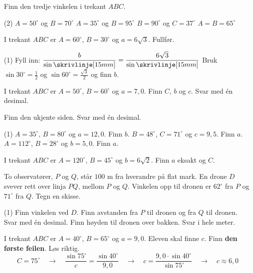 
Finn den tredje vinkelen i trekant $ABC$.
\begin{tasks}(2)
  \task $A = 50^\circ$ og $B = 70^\circ$
  \task $A = 35^\circ$ og $B = 95^\circ$
  \task $B = 90^\circ$ og $C = 37^\circ$
  \task $A = B = 65^\circ$
\end{tasks}

I trekant $ABC$ er $A = 60^\circ$, $B = 30^\circ$ og $a = 6\sqrt3$. Fullfør.
\begin{tasks}(1)
  \task Fyll inn: $\dfrac{b}{\sin \skrivlinje[15mm]} = \dfrac{6\sqrt3}{\sin \skrivlinje[15mm]}$
  \task Bruk $\sin 30^\circ = \frac12$ og $\sin 60^\circ = \frac{\sqrt3}{2}$ og finn $b$.
\end{tasks}

I trekant $ABC$ er $A = 50^\circ$, $B = 60^\circ$ og $a = 7,0$. Finn $C$, $b$ og $c$. Svar med én desimal.


Finn den ukjente siden. Svar med én desimal.
\begin{tasks}(1)
  \task $A = 35^\circ$, $B = 80^\circ$ og $a = 12,0$. Finn $b$.
  \task $B = 48^\circ$, $C = 71^\circ$ og $c = 9,5$. Finn $a$.
  \task $A = 112^\circ$, $B = 28^\circ$ og $b = 5,0$. Finn $a$.
\end{tasks}

I trekant $ABC$ er $A = 120^\circ$, $B = 45^\circ$ og $b = 6\sqrt2$. Finn $a$ eksakt og $C$.

To observatører, $P$ og $Q$, står $100$ m fra hverandre på flat mark. En drone $D$ svever rett over linja $PQ$, mellom $P$ og $Q$.
Vinkelen opp til dronen er $62^\circ$ fra $P$ og $71^\circ$ fra $Q$. Tegn en skisse.
\begin{tasks}(1)
  \task Finn vinkelen ved $D$.
  \task Finn avstanden fra $P$ til dronen og fra $Q$ til dronen. Svar med én desimal.
  \task Finn høyden til dronen over bakken. Svar i hele meter.
\end{tasks}

I trekant $ABC$ er $A = 40^\circ$, $B = 65^\circ$ og $a = 9,0$. Eleven skal finne $c$. Finn \textbf{den første feilen}. Løs riktig.
\[ C = 75^\circ \quad\longrightarrow\quad \frac{\sin 75^\circ}{c} = \frac{\sin 40^\circ}{9,0} \quad\longrightarrow\quad c = \frac{9,0 \cdot \sin 40^\circ}{\sin 75^\circ} \quad\longrightarrow\quad c \approx 6,0 \]


